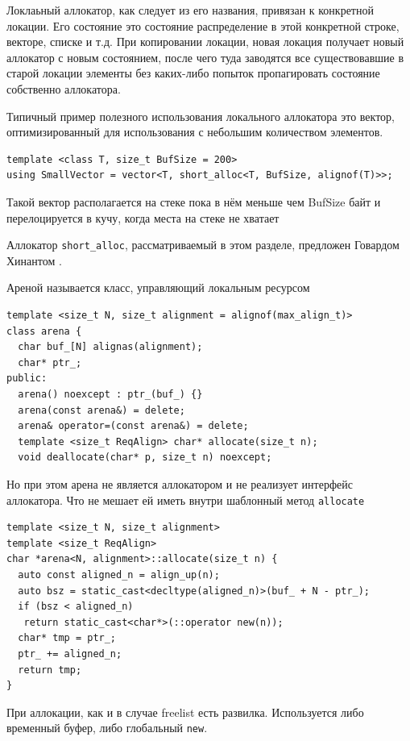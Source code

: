 \documentclass[a4paper,12pt,oneside]{book}
\begin{document}
Локлаьный аллокатор, как следует из его названия, привязан к конкретной локации. Его состояние это состояние распределение в этой конкретной строке, векторе, списке и т.д. При копировании локации, новая локация получает новый аллокатор с новым состоянием, после чего туда заводятся все существовавшие в старой локации элементы без каких-либо попыток пропагировать состояние собственно аллокатора.

Типичный пример полезного использования локального аллокатора это вектор, оптимизированный для использования с небольшим количеством элементов.

\begin{lstlisting}
template <class T, size_t BufSize = 200>
using SmallVector = vector<T, short_alloc<T, BufSize, alignof(T)>>;
\end{lstlisting}

Такой вектор располагается на стеке пока в нём меньше чем BufSize байт и перелоцируется в кучу, когда места на стеке не хватает

Аллокатор \lstinline!short_alloc!, рассматриваемый в этом разделе, предложен Говардом Хинантом \cite{post:hinalloc}.

Ареной называется класс, управляющий локальным ресурсом

\begin{lstlisting}
template <size_t N, size_t alignment = alignof(max_align_t)> 
class arena {
  char buf_[N] alignas(alignment);
  char* ptr_;
public:
  arena() noexcept : ptr_(buf_) {}
  arena(const arena&) = delete;
  arena& operator=(const arena&) = delete;
  template <size_t ReqAlign> char* allocate(size_t n);
  void deallocate(char* p, size_t n) noexcept;
\end{lstlisting}

Но при этом арена не является аллокатором и не реализует интерфейс аллокатора. Что не мешает ей иметь внутри шаблонный метод \lstinline!allocate!

\begin{lstlisting}
template <size_t N, size_t alignment> 
template <size_t ReqAlign>
char *arena<N, alignment>::allocate(size_t n) {
  auto const aligned_n = align_up(n);
  auto bsz = static_cast<decltype(aligned_n)>(buf_ + N - ptr_);
  if (bsz < aligned_n)
   return static_cast<char*>(::operator new(n));
  char* tmp = ptr_;
  ptr_ += aligned_n;
  return tmp;
}
\end{lstlisting}

При аллокации, как и в случае freelist есть развилка. Используется либо временный буфер, либо глобальный \lstinline!new!.
\end{document}

